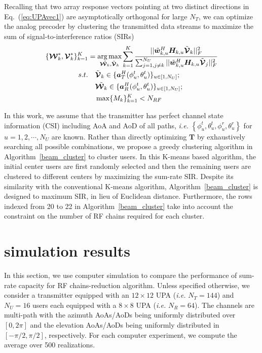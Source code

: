 \documentclass[conference]{IEEEtran}
\def\argmax{\mathop{\mbox{arg\,max}}}
\begin{document}
{Recalling that two array response vectors pointing at two distinct directions in Eq.~(\ref{eq:UPAvec1}) are asymptotically orthogonal for large $N_T$, we can optimize the analog precoder by clustering the transmitted data streams to maximize the sum of signal-to-interference ratios (SIRs)
\begin{align}\label{eq:group-scheduling}
\{\bm{\mathcal{W}}^*_k, \bm{\mathcal{V}}^*_k\}_{k=1}^{K} &= \argmax_{\tilde{\bm{\mathcal{W}}_k},\tilde{\bm{\mathcal{V}}}_k} \sum_{k=1}^{K}\frac{||\tilde{\bm{w}}^H_{k,u} \bm{H}_{k,u} \tilde{\bm{\mathcal{V}}}_k||_F^2}{\sum_{j=1,j\neq k}^{N_U}||\tilde{\bm{w}}^H_{k,u} \bm{H}_{k,u} \tilde{\bm{\mathcal{V}}}_j||_F^2}  \\ \nonumber
s.t. &\quad \tilde{\bm{\mathcal{V}}}_{k} \in  \{\bm{a}^H_{T}(\phi^t_{u},\theta^t_{u})\}_{u\in [1,N_U]}; \\
&\quad \tilde{\bm{\mathcal{W}}_k} \in \{\bm{a}^H_{R}(\phi^t_{u},\theta^t_{u})\}_{u\in [1,N_U]};\nonumber\\
&\quad \max\{M_k\}_{k=1}^K<N_{RF}\nonumber
\end{align}

In this work, we assume that the transmitter has perfect channel state information (CSI) including AoA and AoD of all paths, {\em i.e.} $\left\{\phi^t_u,\theta^t_u,\phi^r_u,\theta^r_u\right\}$ for $u=1,2,\cdots,N_U$ are known. Rather than directly optimizing $\bm{T}$ by exhaustively searching all possible combinations, we propose a greedy clustering algorithm in Algorithm~\ref{beam_cluster} to cluster users. In this K-means based algorithm, the initial center users are first randomly selected and then the remaining users are clustered to different centers by maximizing the sum-rate SIR. Despite its similarity with the conventional K-means algorithm, Algorithm~\ref{beam_cluster} is designed to maximum SIR, in lieu of Euclidean distance. Furthermore, the rows indexed from 20 to 22 in Algorithm~\ref{beam_cluster} take into account the constraint on the number of RF chains required for each cluster.




\section{simulation results}
In this section, we use computer simulation to compare the performance of sum-rate capacity for RF chains-reduction algorithm. Unless specified otherwise, we consider a transmitter equipped with an $12\times 12$ UPA ({\em i.e.} $N_T=144$) and $N_U=16$ users each equipped with a $8\times 8$ UPA ({\em i.e.} $N_R=64$). The channels are multi-path with the azimuth AoAs/AoDs being uniformly distributed over $[0, 2\pi]$ and the elevation AoAs/AoDs being uniformly distributed in $[-\pi/2, \pi/2]$, respectively. For each computer experiment, we compute the average over 500 realizations.

}
\end{document}
